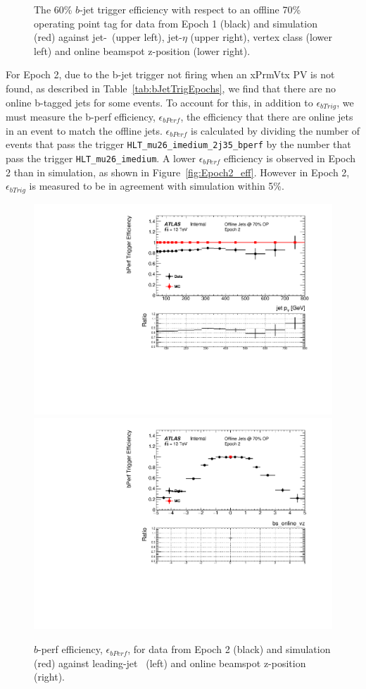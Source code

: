 \begin{figure}[!ht]
\begin{center}
\end{center}
\caption{The 60\% $b$-jet trigger efficiency with respect to an offline 70\% operating point tag
  for data from Epoch 1 (black) and simulation (red) against jet-\pT~(upper left),
  jet-$\eta$ (upper right), vertex class (lower left) and online beamspot z-position (lower right).}
\label{fig:Epoch1_eff}
\end{figure}

For Epoch 2, due to the b-jet trigger not firing when an xPrmVtx PV is not found, as described in Table~\ref{tab:bJetTrigEpochs},
we find that there are no online b-tagged jets for some events.
To account for this, in addition to $\epsilon_{bTrig}$, we must measure the b-perf efficiency, $\epsilon_{bPerf}$,
the efficiency that there are online jets in an event to match the offline jets.
$\epsilon_{bPerf}$ is calculated by dividing the number of events that pass the trigger
\verb|HLT_mu26_imedium_2j35_bperf| by the number that pass the trigger \verb|HLT_mu26_imedium|.
A lower $\epsilon_{bPerf}$ efficiency is observed in Epoch 2 than in simulation,
as shown in Figure~\ref{fig:Epoch2_eff}.
However in Epoch 2, $\epsilon_{bTrig}$ is measured to be in agreement with simulation within 5\%.

\begin{figure}[!ht]
\begin{center}
  \includegraphics[width=0.45\linewidth, angle=0]{figs/Trigger/btrigger_old/Epoch2_trigReq_bPerfEff_jetPt.pdf}
  \includegraphics[width=0.45\linewidth, angle=0]{figs/Trigger/btrigger_old/Epoch2_trigReq_bPerfEff_bs_online_vz.pdf}
\end{center}
\caption{$b$-perf efficiency, $\epsilon_{bPerf}$, for data from Epoch 2 (black) and simulation (red) against leading-jet \pT~(left) and online beamspot z-position (right).}
\label{fig:Epoch2_bperf}
\end{figure}


